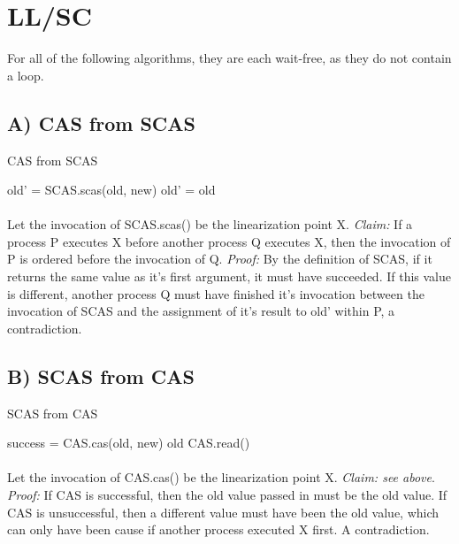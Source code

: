 \documentclass[11pt]{article}
\begin{document}
\maketitle

\section{LL/SC}
For all of the following algorithms, they are each wait-free, as they do not contain a loop.
\subsection*{A) CAS from SCAS}
\begin{algorithm}
    \caption{CAS from SCAS}
    \begin{algorithmic}[1]
        \State old' = SCAS.scas(old, new)
        \State \Return old' = old
    \EndFunction
    \end{algorithmic}
\end{algorithm}
\paragraph{} Let the invocation of SCAS.scas() be the linearization point X. \textit{Claim:} If a process P executes X before another process Q executes X, then the invocation of P is ordered before the invocation of Q. \textit{Proof:} By the definition of SCAS, if it returns the same value as it's first argument, it must have succeeded. If this value is different, another process Q must have finished it's invocation between the invocation of SCAS and the assignment of it's result to old' within P, a contradiction.

\pagebreak
\subsection*{B) SCAS from CAS}
\begin{algorithm}
    \caption{SCAS from CAS}
    \begin{algorithmic}[1]
        \State success = CAS.cas(old, new)
            \State \Return old
        \Else 
            \State \Return CAS.read()
        \EndIf
    \EndFunction
    \end{algorithmic}
\end{algorithm}
\paragraph{} Let the invocation of CAS.cas() be the linearization point X. \textit{Claim: see above}. \textit{Proof:} If CAS is successful, then the old value passed in must be the old value. If CAS is unsuccessful, then a different value must have been the old value, which can only have been cause if another process executed X first. A contradiction.
\end{document}
